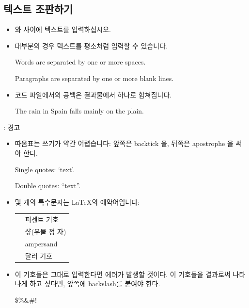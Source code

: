 \documentclass{beamer}
\begin{document}
\subsection{텍스트 조판하기}
\begin{frame}[fragile]{\insertsubsection{}}
\small
\begin{itemize}
\item {} 와  사이에 텍스트를 입력하십시오.
\item 대부분의 경우 텍스트를 평소처럼 입력할 수 있습니다.
\begin{exampletwouptiny}
	Words are separated by one or more
	spaces.
	
	Paragraphs are separated by one
	or more blank lines.
\end{exampletwouptiny}
\item 코드 파일에서의 공백은 결과물에서 하나로 합쳐집니다.
\begin{exampletwouptiny}
	The   rain       in Spain
	falls mainly on the plain.
\end{exampletwouptiny}
\end{itemize}
\end{frame}

\begin{frame}[fragile]{\insertsubsection{}: 경고}
\small
\begin{itemize}
\item 따옴표는 쓰기가 약간 어렵습니다: 앞쪽은 backtick \keystroke{\`{}}을, 뒤쪽은 apostrophe \keystroke{\'{}} 을 써야 한다.
\begin{exampletwouptiny}
	Single quotes: `text'.
	
	Double quotes: ``text''.
\end{exampletwouptiny}

\item 몇 개의 특수문자는 \LaTeX 의 예약어입니다:\\[1ex]
\begin{tabular}{cl}
\keystrokebftt{\%} & 퍼센트 기호               \\
\keystrokebftt{\#} & 샾(우물 정 자)            \\
\keystrokebftt{\&} & ampersand                 \\
\keystrokebftt{\$} & 달러 기호                 \\
\end{tabular}
\item 이 기호들은 그대로 입력한다면 에러가 발생할 것이다. 이 기호들을 결과로써
나타나게 하고 싶다면, 앞쪽에 backslash를 붙여야 한다.
\begin{exampletwoup}
\$\%\&\#!
\end{exampletwoup}
\end{itemize}
\end{frame}
\end{document}
